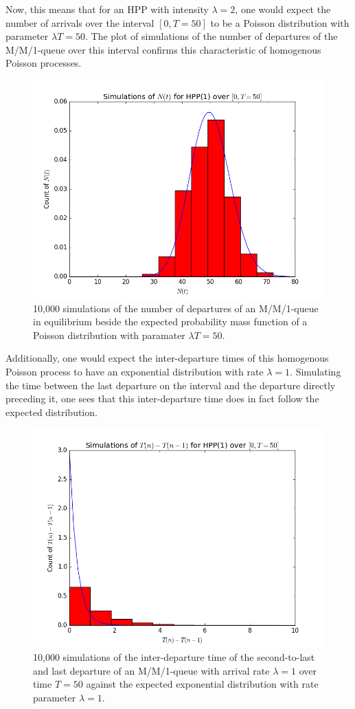 \documentclass[11pt, oneside]{article}
\begin{document}
Now, this means that for an HPP with intensity $\lambda=2$, one would expect the number of arrivals over the interval $[0,T=50]$ to be a Poisson distribution with parameter $\lambda T=50$. The plot of simulations of the number of departures of the M/M/1-queue over this interval confirms this characteristic of homogenous Poisson processes. 
\begin{figure}[H]
\includegraphics[scale=0.55]{nt_hpp}
\caption{10,000 simulations of the number of departures of an M/M/1-queue in equilibrium beside the expected probability mass function of a Poisson distribution with paramater $\lambda T=50$.}
\label{fig:x}
\end{figure}
Additionally, one would expect the inter-departure times of this homogenous Poisson process to have an exponential distribution with rate $\lambda = 1$. Simulating the time between the last departure on the interval and the departure directly preceding it, one sees that this inter-departure time does in fact follow the expected distribution.
\begin{figure}[H]
\includegraphics[scale=0.55]{tn_tn1}
\caption{10,000 simulations of the inter-departure time of the second-to-last and last departure of an M/M/1-queue with arrival rate $\lambda = 1$ over time $T=50$ against the expected exponential distribution with rate parameter $\lambda = 1$.}
\label{fig:x}
\end{figure}
\end{document}
